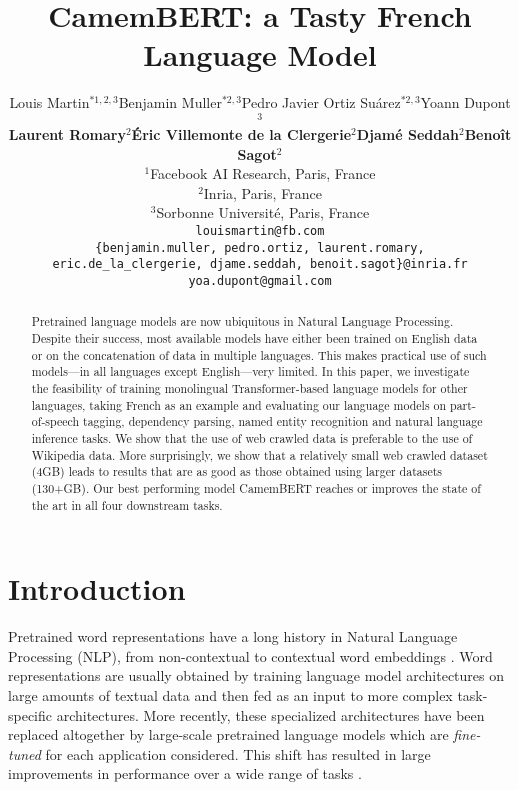 \documentclass[11pt,a4paper]{article}
\title{CamemBERT: a Tasty French Language Model}
\author{Louis Martin$^{* 1,2,3}$\quad Benjamin Muller$^{* 2,3}$\quad Pedro Javier Ortiz Su\'arez$^{* 2,3}$\quad Yoann Dupont$^3$\\ \large\textbf{Laurent Romary$^2$\quad \'Eric Villemonte de la Clergerie$^2$\quad Djam\'e Seddah$^2$\quad Beno\^it Sagot$^2$}\\
  $^{1}$Facebook AI Research, Paris, France \\
  $^{2}$Inria, Paris, France \\
  $^{3}$Sorbonne Universit\'e, Paris, France\\
  \texttt{louismartin@fb.com}\\
  \texttt{\{benjamin.muller, pedro.ortiz, laurent.romary,}\\
  \texttt{eric.de\_la\_clergerie, djame.seddah, benoit.sagot\}@inria.fr}\\ 
  \texttt{yoa.dupont@gmail.com}}
\date{}
\newcommand{\camembert}{CamemBERT\xspace}
\begin{document}
\maketitle



\begin{abstract}


Pretrained language models are now ubiquitous in Natural Language Processing. 
Despite their success, most available models have either been trained on English data or on the concatenation of data in multiple languages. This makes practical use of such models---in all languages except English---very limited. In this paper, we investigate the feasibility of training monolingual Transformer-based language models for other languages, taking French as an example and evaluating our language models on part-of-speech tagging, dependency parsing, named entity recognition and natural language inference tasks. We show that the use of web crawled data is preferable to the use of Wikipedia data. More surprisingly, we show that a relatively small web crawled dataset (4GB) leads to results that are as good as those obtained using larger datasets (130+GB). Our best performing model \camembert reaches or improves the state of the art in all four downstream tasks. 

\end{abstract}

\renewcommand{\thefootnote}{\fnsymbol{footnote}}
\renewcommand{\thefootnote}{\arabic{footnote}}

\section{Introduction}

Pretrained word representations have a long history in Natural Language Processing (NLP), from non-contextual \cite{brown1992class,ando2005framework,mikolov2013distributed,pennington2014glove} to contextual word embeddings \cite{peters2018deep,akbik2018contextual}.
Word representations are usually obtained by training language model architectures on large amounts of textual data and then fed as an input to more complex task-specific architectures.
More recently, these specialized architectures have been replaced altogether by large-scale pretrained language models which are {\em fine-tuned} for each application considered.
This shift has resulted in large improvements in performance over a wide range of tasks \cite{devlin2019bert,radford2019language,liu2019roberta,raffel2019exploring}.
\end{document}
